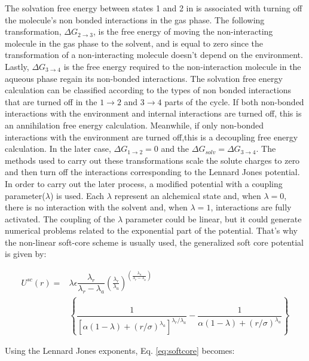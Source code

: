 The solvation free energy between states 1 and 2 in  is associated with turning off the molecule's non bonded interactions in the gas phase. The following transformation, $\Delta G_{2 \rightarrow 3}$, is the free energy of moving the non-interacting molecule in the gas phase to the solvent, and is equal to zero since the transformation of a non-interacting molecule doesn't depend on the environment. Lastly, $\Delta G_{3 \rightarrow 4}$ is the free energy required to the non-interaction molecule in the aqueous phase regain its non-bonded interactions.  The solvation free energy calculation can be classified according to the types of non bonded interactions that are turned off in the $1 \rightarrow 2$ and $ 3 \rightarrow 4$ parts of the cycle. If both non-bonded interactions with the environment and internal interactions are turned off, this is an annihilation free energy calculation. Meanwhile, if only non-bonded interactions with the environment are turned off,this is a decoupling free energy calculation. In the later case, $\Delta G_{1 \rightarrow 2} = 0$ and the $\Delta G_{solv} = \Delta G_{3 \rightarrow 4} $. The methods used to carry out these transformations scale the solute charges to zero and then turn off the interactions corresponding to the Lennard Jones potential. In order to carry out the later process, a modified potential with a coupling parameter($\lambda$) is used. Each $\lambda$ represent an alchemical state and, when $\lambda=0$, there is no interaction with the solvent and, when $\lambda=1$, interactions are fully activated. The coupling of the $\lambda$ parameter could be linear, but it could generate numerical problems related to the exponential part of the potential. That's why the non-linear soft-core scheme \cite{beutler1994} is usually used, the generalized soft core potential is given by:

\begin{equation}
\label{eq:softcore}
\begin{aligned}
U^{sc}(r) {}=& \lambda\epsilon\dfrac{\lambda_r}{\lambda_r - \lambda_a} \left(\frac{\lambda_r}{\lambda_a} \right)^{\left( \frac{\lambda_a}{\lambda_r - \lambda_a} \right)} \\
& \left\lbrace\dfrac{1}{\left[\alpha(1-\lambda)+ (r/\sigma)^{\lambda_a}\right]^{\lambda_{r}/\lambda_{a}}} - \dfrac{1}{\alpha(1-\lambda)+(r/\sigma)^{\lambda_a}}\right\rbrace
\end{aligned}
\end{equation}

Using the Lennard Jones exponents, Eq. \eqref{eq:softcore} becomes:

